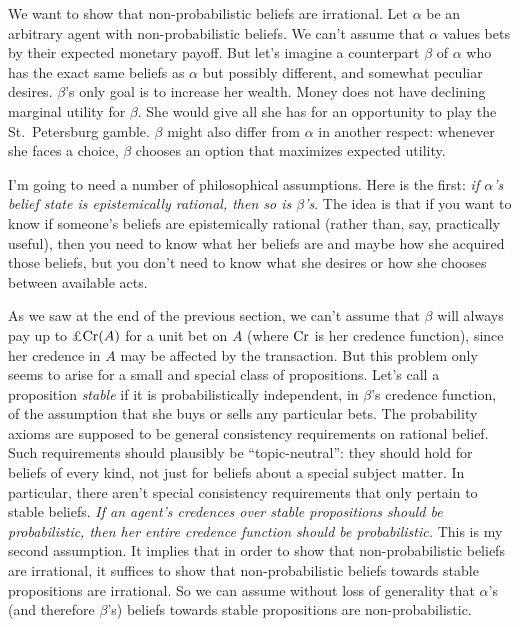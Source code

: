 We want to show that non-probabilistic beliefs are irrational. Let $\alpha$ be
an arbitrary agent with non-probabilistic beliefs. We can't assume that $\alpha$
values bets by their expected monetary payoff. But let's imagine a counterpart
$\beta$ of $\alpha$ who has the exact same beliefs as $\alpha$ but possibly
different, and somewhat peculiar desires. $\beta$'s only goal is to increase her
wealth. Money does not have declining marginal utility for $\beta$. She would
give all she has for an opportunity to play the St.\ Petersburg gamble. $\beta$
might also differ from $\alpha$ in another respect: whenever she faces a choice,
$\beta$ chooses an option that maximizes expected utility.

I'm going to need a number of philosophical assumptions. Here is the first:
\emph{if $\alpha$'s belief state is epistemically rational, then so is
  $\beta$'s}. The idea is that if you want to know if someone's beliefs are
epistemically rational (rather than, say, practically useful), then you need
to know what her beliefs are and maybe how she acquired those beliefs, but you
don't need to know what she desires or how she chooses between available acts.

As we saw at the end of the previous section, we can't assume that $\beta$ will
always pay up to £$\text{Cr}(A)$ for a unit bet on $A$ (where $\text{Cr}$ is her credence
function), since her credence in $A$ may be affected by the transaction. But
this problem only seems to arise for a small and special class of propositions.
Let's call a proposition \emph{stable} if it is probabilistically independent,
in $\beta$'s credence function, of the assumption that she buys or sells any
particular bets. The probability axioms are supposed to be general consistency
requirements on rational belief. Such requirements should plausibly be
``topic-neutral'': they should hold for beliefs of every kind, not just for
beliefs about a special subject matter. In particular, there aren't special
consistency requirements that only pertain to stable beliefs. \emph{If an
  agent's credences over stable propositions should be probabilistic, then her
  entire credence function should be probabilistic.} This is my second
assumption. It implies that in order to show that non-probabilistic beliefs are
irrational, it suffices to show that non-probabilistic beliefs towards stable
propositions are irrational. So we can assume without loss of generality that
$\alpha$'s (and therefore $\beta$'s) beliefs towards stable propositions are
non-probabilistic.


